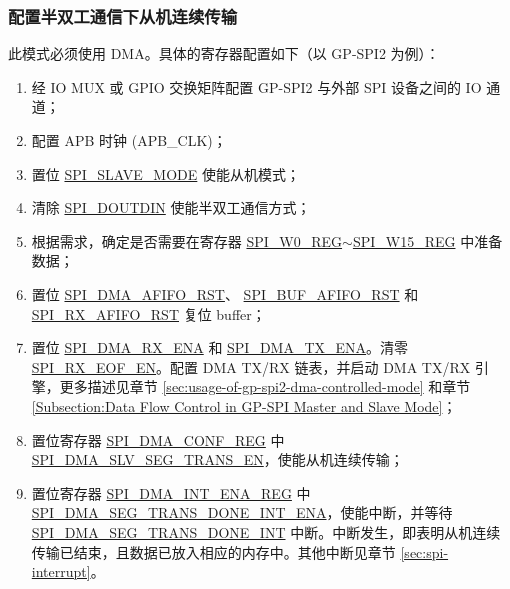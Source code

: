 \documentclass[main\_\_CN.tex]{subfiles}
\begin{document}
\subsubsection{配置半双工通信下从机连续传输}\label{sec:gp-spi2-slave-hd-seg-trans}

此模式必须使用 DMA。具体的寄存器配置如下（以 GP-SPI2 为例）：

\begin{enumerate}
   \item 经 IO MUX 或 GPIO 交换矩阵配置 GP-SPI2 与外部 SPI 设备之间的 IO 通道； 
   
   \item 配置 APB 时钟 (APB\_CLK)；

    \item 置位 \hyperref[fielddesc:SPISLAVEMODE]{SPI\_SLAVE\_MODE} 使能从机模式； 
    
    \item 清除 \hyperref[fielddesc:SPIDOUTDIN]{SPI\_DOUTDIN} 使能半双工通信方式；
    
    \item 根据需求，确定是否需要在寄存器 \hyperref[regdesc:SPIW0REG]{SPI\_W0\_REG}$\sim$\hyperref[regdesc:SPIW15REG]{SPI\_W15\_REG} 中准备数据； 
    
    \item 置位 \hyperref[fielddesc:SPIDMAAFIFORST]{SPI\_DMA\_AFIFO\_RST}、 \hyperref[fielddesc:SPIBUFAFIFORST]{SPI\_BUF\_AFIFO\_RST} 和 \hyperref[fielddesc:SPIRXAFIFORST]{SPI\_RX\_AFIFO\_RST} 复位 buffer；
        
    \item 置位 \hyperref[fielddesc:SPIDMARXENA]{SPI\_DMA\_RX\_ENA} 和 \hyperref[fielddesc:SPIDMATXENA]{SPI\_DMA\_TX\_ENA}。清零 \hyperref[fielddesc:SPIRXEOFEN]{SPI\_RX\_EOF\_EN}。配置 DMA TX/RX 链表，并启动 DMA TX/RX 引擎，更多描述见章节 \ref{sec:usage-of-gp-spi2-dma-controlled-mode} 和章节 \ref{Subsection:Data Flow Control in GP-SPI Master and Slave Mode}；

    \item 置位寄存器 \hyperref[regdesc:SPIDMACONFREG]{SPI\_DMA\_CONF\_REG} 中 \hyperref[fielddesc:SPIDMASLVSEGTRANSEN]{SPI\_DMA\_SLV\_SEG\_TRANS\_EN}，使能从机连续传输；
    
    \item 置位寄存器 \hyperref[regdesc:SPIDMAINTENAREG]{SPI\_DMA\_INT\_ENA\_REG} 中 \hyperref[fielddesc:SPIDMASEGTRANSDONEINTENA]{SPI\_DMA\_SEG\_TRANS\_DONE\_INT\_ENA}，使能中断，并等待 \hyperref[int:SPIDMASEGTRANSDONEINT]{SPI\_DMA\_SEG\_TRANS\_DONE\_INT} 中断。中断发生，即表明从机连续传输已结束，且数据已放入相应的内存中。其他中断见章节 \ref{sec:spi-interrupt}。
\end{enumerate}
\end{document}
